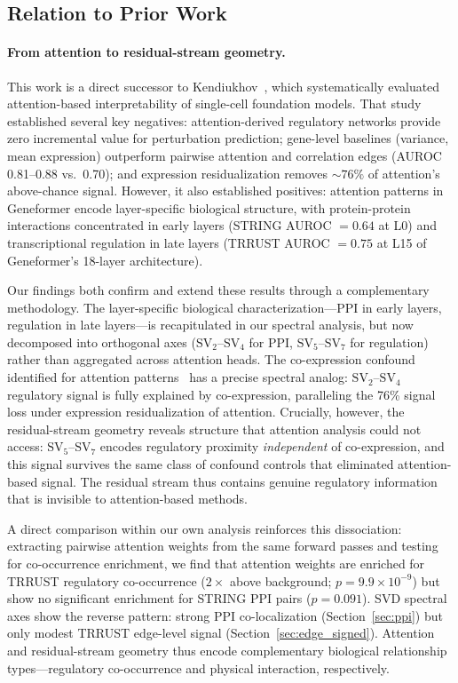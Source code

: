 \documentclass[10pt,twocolumn]{article}
\newcommand{\SV}[1]{\mathrm{SV}_{#1}}
\begin{document}
\subsection{Relation to Prior Work}

\paragraph{From attention to residual-stream geometry.}
This work is a direct successor to Kendiukhov~\citep{kendiukhov2025attention}, which systematically evaluated attention-based interpretability of single-cell foundation models.
That study established several key negatives: attention-derived regulatory networks provide zero incremental value for perturbation prediction; gene-level baselines (variance, mean expression) outperform pairwise attention and correlation edges (AUROC 0.81--0.88 vs.\ 0.70); and expression residualization removes ${\sim}76\%$ of attention's above-chance signal.
However, it also established positives: attention patterns in Geneformer encode layer-specific biological structure, with protein-protein interactions concentrated in early layers (STRING AUROC $= 0.64$ at L0) and transcriptional regulation in late layers (TRRUST AUROC $= 0.75$ at L15 of Geneformer's 18-layer architecture).

Our findings both confirm and extend these results through a complementary methodology.
The layer-specific biological characterization---PPI in early layers, regulation in late layers---is recapitulated in our spectral analysis, but now decomposed into orthogonal axes ($\SV{2}$--$\SV{4}$ for PPI, $\SV{5}$--$\SV{7}$ for regulation) rather than aggregated across attention heads.
The co-expression confound identified for attention patterns~\citep{kendiukhov2025attention} has a precise spectral analog: $\SV{2}$--$\SV{4}$ regulatory signal is fully explained by co-expression, paralleling the 76\% signal loss under expression residualization of attention.
Crucially, however, the residual-stream geometry reveals structure that attention analysis could not access: $\SV{5}$--$\SV{7}$ encodes regulatory proximity \emph{independent} of co-expression, and this signal survives the same class of confound controls that eliminated attention-based signal.
The residual stream thus contains genuine regulatory information that is invisible to attention-based methods.

A direct comparison within our own analysis reinforces this dissociation: extracting pairwise attention weights from the same forward passes and testing for co-occurrence enrichment, we find that attention weights are enriched for TRRUST regulatory co-occurrence ($2\times$ above background; $p = 9.9 \times 10^{-9}$) but show no significant enrichment for STRING PPI pairs ($p = 0.091$).
SVD spectral axes show the reverse pattern: strong PPI co-localization (Section~\ref{sec:ppi}) but only modest TRRUST edge-level signal (Section~\ref{sec:edge_signed}).
Attention and residual-stream geometry thus encode complementary biological relationship types---regulatory co-occurrence and physical interaction, respectively.
\end{document}
